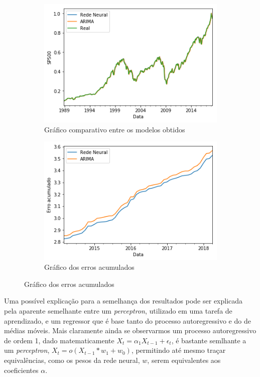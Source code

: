 \documentclass[
    12pt,
    oneside,
    a4paper,
    english,
    brazil
]{abntex2}
\begin{document}
\begin{figure}[ht]
    \caption{Comparativos dos resultados}\label{fig:comparesp500}
    \begin{subfigure}{.5\textwidth}
        \caption{Gráfico comparativo entre os modelos obtidos}\label{fig:comprealsp500}
        \includegraphics[width=.8\linewidth]{images/sp500_prediction_compare.png}
    \end{subfigure}
    \begin{subfigure}{.5\textwidth}
        \caption{Gráfico dos erros acumulados}\label{fig:cumsumsp500}
        \includegraphics[width=.8\linewidth]{images/sp500_cumsum.png}
    \end{subfigure}
\end{figure}

Uma possível  explicação para  a semelhança dos  resultados pode  ser explicada
pela aparente semelhante entre um  \textit{perceptron}, utilizado em uma tarefa
de aprendizado,  e um regressor que  é base tanto do  processo autoregressivo e
do  de  médias  móveis.  Mais  claramente  ainda  se  observarmos  um  processo
autoregressivo  de  ordem 1,  dado  matematicamente  $X_t =  \alpha_1X_{t-1}  +
\epsilon_t$, é bastante semlhante a  um \textit{perceptron}, $X_t = o(X_{t-1} *
w_1 + w_0)$,  permitindo até mesmo traçar equivalências, como  os pesos da rede
neural, $w$, serem equivalentes aos coeficientes $\alpha$.
\end{document}
